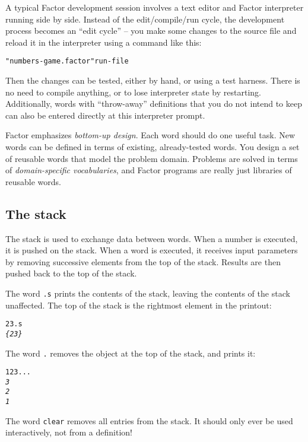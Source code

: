 \documentclass[english]{article}
\begin{document}
A typical Factor development session involves a text editor and Factor
interpreter running side by side. Instead of the edit/compile/run
cycle, the development process becomes an {}``edit cycle'' -- you
make some changes to the source file and reload it in the interpreter
using a command like this:

\begin{alltt}
"numbers-game.factor" run-file
\end{alltt}

Then the changes can be tested, either by hand, or using a test harness.
There is no need to compile anything, or to lose interpreter state
by restarting. Additionally, words with {}``throw-away'' definitions
that you do not intend to keep can also be entered directly at this
interpreter prompt.

Factor emphasizes \emph{bottom-up design}. Each word should do one useful task. New words can be defined in terms
of existing, already-tested words. You design a set of reusable words
that model the problem domain. Problems are solved in terms
of \emph{domain-specific vocabularies}, and Factor programs are really just libraries of reusable words.

\subsection{The stack}

The stack is used to exchange data between words. When a number is
executed, it is pushed on the stack. When a word is executed, it receives
input parameters by removing successive elements from the top of the
stack. Results are then pushed back to the top of the stack. 

The word \texttt{.s} prints the contents of the stack, leaving the
contents of the stack unaffected. The top of the stack is the rightmost
element in the printout:

\begin{alltt}
2 3 .s
\emph{\{ 2 3 \}}
\end{alltt}

The word \texttt{.} removes the object at the top of the stack, and
prints it:

\begin{alltt}
1 2 3 . . .
\emph{3}
\emph{2}
\emph{1}
\end{alltt}

The word \texttt{clear} removes all entries from the stack. It should only ever be used interactively, not from a definition!
\end{document}
